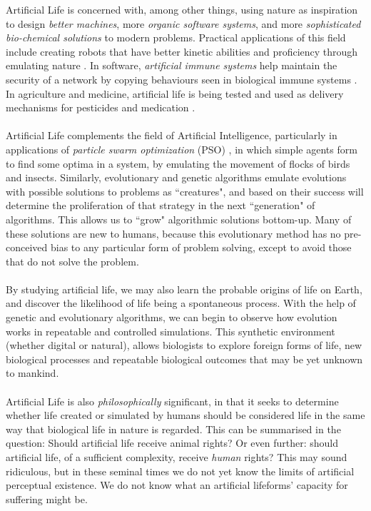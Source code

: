 \documentclass[10pt,a4paper]{article}
\begin{document}
				Artificial Life is concerned with, among other things, using nature as inspiration to design \textsl{better machines}, more \textsl{organic software systems}, and more \textsl{sophisticated bio-chemical solutions} to modern problems. Practical applications of this field include creating robots that have better kinetic abilities and proficiency through emulating nature \cite{boston}. In software, \textsl{artificial immune systems} help maintain the security of a network by copying behaviours seen in biological immune systems \cite{immune}. In agriculture and medicine, artificial life is being tested and used as delivery mechanisms for pesticides and medication \cite{geneng}.
				\\\\
				Artificial Life complements the field of Artificial Intelligence, particularly in applications of \textsl{particle swarm optimization} (PSO) \cite{pos}, in which simple agents form to find some optima in a system, by emulating the movement of flocks of birds and insects. Similarly, evolutionary and genetic algorithms emulate evolutions with possible solutions to problems as ``creatures", and based on their success will determine the proliferation of that strategy in the next ``generation" of algorithms. This allows us to ``grow" algorithmic solutions bottom-up. Many of these solutions are new to humans, because this evolutionary method has no pre-conceived bias to any particular form of problem solving, except to avoid those that do not solve the problem.
				\\\\
				By studying artificial life, we may also learn the probable origins of life on Earth, and discover the likelihood of life being a spontaneous process. With the help of genetic and evolutionary algorithms, we can begin to observe how evolution works in repeatable and controlled simulations. This synthetic environment (whether digital or natural), allows biologists to explore foreign forms of life, new biological processes and repeatable biological outcomes that may be yet unknown to mankind.
				\\\\
				Artificial Life is also \textsl{philosophically} significant, in that it seeks to determine whether life created or simulated by humans should be considered life in the same way that biological life in nature is regarded. This can be summarised in the question: Should artificial life receive animal rights? Or even further: should artificial life, of a sufficient complexity, receive \textsl{human} rights? This may sound ridiculous, but in these seminal times we do not yet know the limits of artificial perceptual existence. We do not know what an artificial lifeforms' capacity for suffering might be.
				
\end{document}
